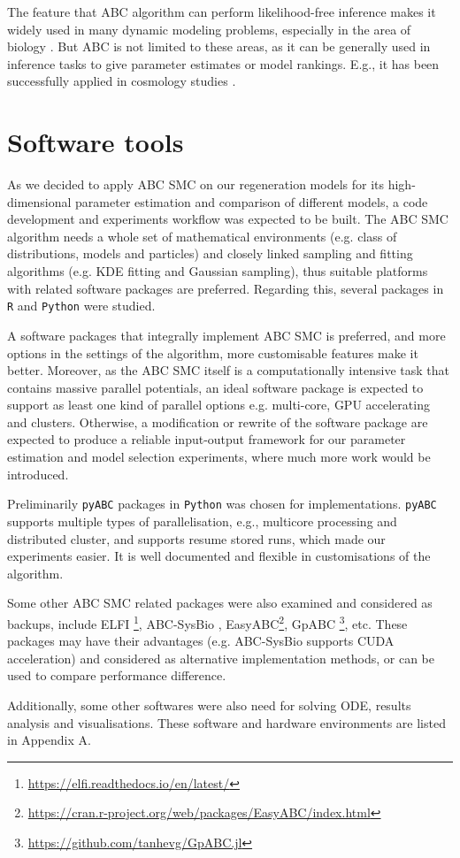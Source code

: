 The feature that ABC algorithm can perform likelihood-free inference makes it widely used in many dynamic modeling problems, especially in the area of biology \cite{ref:abcsysbio, ref:disease, ref:compare}. But ABC is not limited to these areas, as it can be generally used in inference tasks to give parameter estimates or model rankings. E.g., it has been successfully applied in cosmology studies \cite{cosmology}.



\section{Software tools}



 As we decided to apply ABC SMC on our regeneration models for its high-dimensional parameter estimation and comparison of different models, a code development and experiments workflow was expected to be built. The ABC SMC algorithm needs a whole set of mathematical environments (e.g. class of distributions, models and particles) and closely linked sampling and fitting algorithms (e.g. KDE fitting and Gaussian sampling), thus suitable platforms with related software packages are preferred. Regarding this, several packages in \verb|R| and \verb|Python| were studied.

 A software packages that integrally implement ABC SMC is preferred, and more options in the settings of the algorithm, more customisable features make it better. Moreover, as the ABC SMC itself is a computationally intensive task that contains massive parallel potentials, an ideal software package is expected to support as least one kind of parallel options e.g. multi-core, GPU accelerating and clusters. Otherwise, a modification or rewrite of the software package are expected to produce a reliable input-output framework for our parameter estimation and model selection experiments, where much more work would be introduced.

 Preliminarily \verb|pyABC| packages \cite{ref:pyabc} in \verb|Python| was chosen for implementations. \verb|pyABC| supports multiple types of parallelisation, e.g., multicore processing and distributed cluster, and supports resume stored runs, which made our experiments easier. It is well documented and flexible in customisations of the algorithm.

 Some other ABC SMC related packages were also examined and considered as backups, include ELFI \footnote{\url{https://elfi.readthedocs.io/en/latest/}}, ABC-SysBio \cite{ref:abcsysbio}, EasyABC\footnote{\url{https://cran.r-project.org/web/packages/EasyABC/index.html}}, GpABC \footnote{\url{https://github.com/tanhevg/GpABC.jl}}, etc. These packages may have their advantages (e.g. ABC-SysBio supports CUDA acceleration) and considered as alternative implementation methods, or can be used to compare performance difference.

 Additionally, some other softwares were also need for solving ODE, results analysis and visualisations. These software and hardware environments are listed in Appendix A.